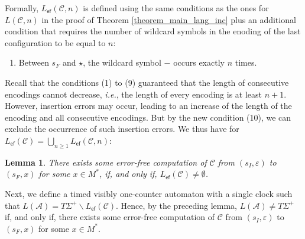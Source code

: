 \documentclass{CSML}
\theoremstyle{plain}\newtheorem{theorem}[thm]{Theorem}
\theoremstyle{plain}\newtheorem{corollary}[thm]{Corollary}
\theoremstyle{plain}\newtheorem{example}[thm]{Example}
\theoremstyle{plain}\newtheorem{lemma}[thm]{Lemma}
\theoremstyle{plain}\newtheorem{remark}[thm]{Remark}
\newcommand*\ie{\textit{i.e.}}
\newcommand{\A}{\mathcal{A}}
\newcommand{\cm}{\mathcal{C}}
\begin{document}
		
		Formally, $L_{\mathsf{ef}}(\cm,n)$ is defined using the same conditions as the ones for $L(\cm,n)$ in the proof of Theorem \ref{theorem_main_lang_inc} plus an additional condition that requires the number of wildcard symbols in the enoding of the last configuration to be equal to $n$:		
		\begin{enumerate}
		\addtocounter{enumi}{9} 
	\item Between $s_F$ and $\star$, the wildcard symbol $-$ occurs exactly $n$ times. 
		\end{enumerate}	
		Recall that the conditions (1) to (9) guaranteed that the length of consecutive encodings cannot decrease, \ie, the length of every encoding is at least $n+1$. However, insertion errors may occur, leading to an increase of the length of the encoding and all consecutive encodings.  
		But by the new condition (10), we can exclude the occurrence of such insertion errors. 	We thus have for $L_{\mathsf{ef}}(\cm)=\bigcup_{n\geq 1}L_{\mathsf{ef}}(\cm,n)$:
		\begin{lemma}
			\label{lemma_univ_automata}
			There exists some error-free computation of $\cm$ from $(s_I,\varepsilon)$ to $(s_F,x)$ for some $x\in M^*$, if, and only if, $L_{\mathsf{ef}}(\cm)\neq\emptyset$. 
		\end{lemma}


Next, we define a timed visibly one-counter automaton with a single clock such that $L(\A)=T\Sigma^+\backslash L_{\mathsf{ef}}(\cm)$. 
		Hence, by the preceding lemma, $L(\A)\neq T\Sigma^+$ if, and only if, there exists some error-free computation of $\cm$ from $(s_I,\varepsilon)$ to $(s_F,x)$ for some $x\in M^*$.
		
\end{document}
